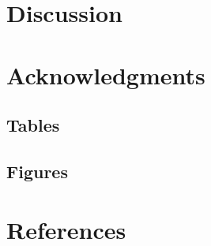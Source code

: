 \documentclass[10pt,letterpaper]{article}
\begin{document}
\section{Discussion}


\section{Acknowledgments}


\subsection{Tables}


\subsection{Figures}






\section{References}



\setlength{\bibleftmargin}{.125in}
\setlength{\bibindent}{-\bibleftmargin}


\end{document}
